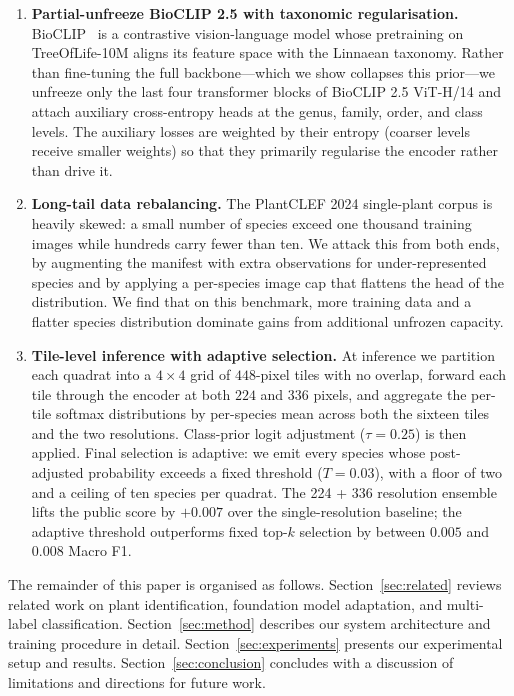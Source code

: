 \documentclass[sigconf]{ceurart}
\begin{document}
\begin{enumerate}
    \item \textbf{Partial-unfreeze BioCLIP 2.5 with taxonomic regularisation.} BioCLIP~\cite{stevens2024bioclip} is a contrastive vision-language model whose pretraining on TreeOfLife-10M aligns its feature space with the Linnaean taxonomy. Rather than fine-tuning the full backbone---which we show collapses this prior---we unfreeze only the last four transformer blocks of BioCLIP 2.5 ViT-H/14 and attach auxiliary cross-entropy heads at the genus, family, order, and class levels. The auxiliary losses are weighted by their entropy (coarser levels receive smaller weights) so that they primarily regularise the encoder rather than drive it.
    \item \textbf{Long-tail data rebalancing.} The PlantCLEF 2024 single-plant corpus is heavily skewed: a small number of species exceed one thousand training images while hundreds carry fewer than ten. We attack this from both ends, by augmenting the manifest with extra observations for under-represented species and by applying a per-species image cap that flattens the head of the distribution. We find that on this benchmark, more training data and a flatter species distribution dominate gains from additional unfrozen capacity.
    \item \textbf{Tile-level inference with adaptive selection.} At inference we partition each quadrat into a $4{\times}4$ grid of $448$-pixel tiles with no overlap, forward each tile through the encoder at both $224$ and $336$ pixels, and aggregate the per-tile softmax distributions by per-species mean across both the sixteen tiles and the two resolutions. Class-prior logit adjustment ($\tau{=}0.25$) is then applied. Final selection is adaptive: we emit every species whose post-adjusted probability exceeds a fixed threshold ($T{=}0.03$), with a floor of two and a ceiling of ten species per quadrat. The 224 + 336 resolution ensemble lifts the public score by $+0.007$ over the single-resolution baseline; the adaptive threshold outperforms fixed top-$k$ selection by between $0.005$ and $0.008$ Macro F1.
\end{enumerate}
The remainder of this paper is organised as follows. Section~\ref{sec:related} reviews related work on plant identification, foundation model adaptation, and multi-label classification. Section~\ref{sec:method} describes our system architecture and training procedure in detail. Section~\ref{sec:experiments} presents our experimental setup and results. Section~\ref{sec:conclusion} concludes with a discussion of limitations and directions for future work.
\end{document}

